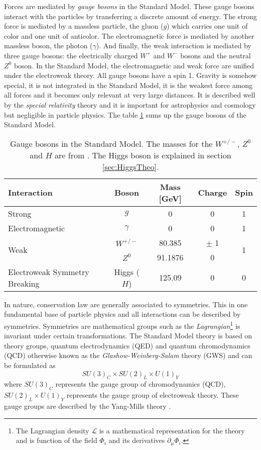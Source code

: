 Forces are mediated by \textit{gauge bosons} in the Standard Model. These gauge bosons interact with the particles by transferring a discrete amount of energy. The strong force is mediated by a massless particle, the gluon ($g$) which carries one unit of color and one unit of anticolor. The electromagnetic force is mediated by another massless boson, the photon ($\gamma$). And finally, the weak interaction is mediated by three gauge bosons: the electrically charged $W^+$ and $W^-$ bosons and the neutral $Z^0$ boson. In the Standard Model, the electromagnetic and weak force are unified under the electroweak theory. All gauge bosons have a spin 1. Gravity is somehow special, it is not integrated in the Standard Model, it is the weakest force among all forces and it becomes only relevant at very large distances. It is described well by the \textit{special relativity} theory \cite{Einstein:1905ve} and it is important for astrophysics and cosmology but negligible in particle physics. The table \ref{table:GaugeBosons} sums up the gauge bosons of the Standard Model.

\begin{table}[htb!]
  \centering
  \caption{Gauge bosons in the Standard Model. The masses for the $W^{+/-}$, $Z^0$ and $H$ are from \cite{Patrignani:2016xqp}. The Higgs boson is explained in section \ref{sec:HiggsTheo}.}
  \label{table:GaugeBosons}
  \begin{tabular}{|p{8cm}||cccc|}
    \hline
    Interaction & Boson & Mass [GeV] & Charge & Spin\\
    \hline
    Strong & $g$ & 0 & 0 & 1\\
    \hline
    Electromagnetic & $\gamma$ & 0 & 0 & 1\\
    \hline
    \multirow{2}{*}{Weak} & $W^{+/-}$ & 80.385 & $\pm$ 1 & \multirow{2}{*}{1}\\
    & $Z^0$ & 91.1876 & 0 &\\
    \hline
    \hline
    Electroweak Symmetry Breaking & Higgs ($H$) & 125.09 & 0 & 0\\
    \hline
  \end{tabular}
\end{table}

In nature, conservation law are generally associated to symmetries. This in one fundamental base of particle physics and all interactions can be described by symmetries. Symmetries are mathematical groups such as the \textit{Lagrangian}\footnote{The Lagrangian density $\mathcal{L}$ is a mathematical representation for the theory and is function of the field $\Phi_i$ and its derivatives $\partial_{\mu}\Phi_i$.} is invariant under certain transformations. The Standard Model theory is based on theory groups, quantum electrodynamics (QED) and quantum chromodynamics (QCD) otherwise known as the \textit{Glashow-Weinberg-Salam} theory (GWS) and can be formulated as
\begin{equation}
  SU(3)_{C} \times SU(2)_{L} \times U(1)_{Y}
\end{equation}
where $SU(3)_{C}$ represents the gauge group of chromodynamics (QCD), $SU(2)_{L} \times U(1)_{Y}$ represents the gauge group of electroweak theory. These gauge groups are described by the Yang-Mills theory \cite{Yang:1954ek}.

